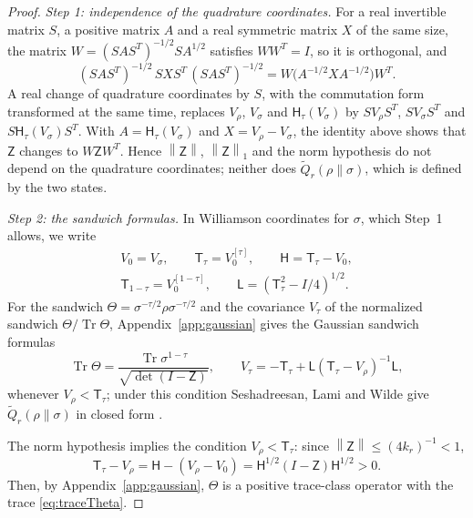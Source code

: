 \documentclass[11pt]{amsart}
\numberwithin{equation}{section}
\theoremstyle{definition}
\newcommand{\Therm}{\mathsf H}
\newcommand{\Qtil}{\widetilde Q}
\newcommand{\Tr}{\operatorname{Tr}}
\newcommand{\norm}[1]{\left\|#1\right\|}
\begin{document}
\begin{proof}
\emph{Step 1: independence of the quadrature coordinates.} For a real
invertible matrix \(S\), a positive matrix \(A\) and a real symmetric
matrix \(X\) of the same size, the matrix
\(W=(SAS^T)^{-1/2}SA^{1/2}\) satisfies \(WW^T=I\), so it is
orthogonal, and
\[
 (SAS^T)^{-1/2}\,SXS^T\,(SAS^T)^{-1/2}
 =W\bigl(A^{-1/2}XA^{-1/2}\bigr)W^T.
\]
A real change of quadrature coordinates by \(S\), with the commutation
form transformed at the same time, replaces \(V_\rho\), \(V_\sigma\) and
\(\Therm_\tau(V_\sigma)\) by \(SV_\rho S^T\), \(SV_\sigma S^T\) and
\(S\Therm_\tau(V_\sigma)S^T\).
With \(A=\Therm_\tau(V_\sigma)\) and \(X=V_\rho-V_\sigma\), the identity
above shows that \(\mathsf Z\) changes to \(W\mathsf ZW^T\). Hence
\(\norm{\mathsf Z}\), \(\norm{\mathsf Z}_1\) and the norm hypothesis do
not depend on the quadrature coordinates; neither does
\(\Qtil_r(\rho\|\sigma)\), which is defined by the two states.

\smallskip
\emph{Step 2: the sandwich formulas.} In Williamson coordinates for
\(\sigma\), which Step~1 allows, we write
\[
 \begin{gathered}
 V_0=V_\sigma,\qquad
 \mathsf T_\tau=V_0^{[\tau]},\qquad \mathsf H=\mathsf T_\tau-V_0,\\
 \mathsf T_{1-\tau}=V_0^{[1-\tau]},\qquad
 \mathsf L=(\mathsf T_\tau^2-I/4)^{1/2}.
 \end{gathered}
\]
For the sandwich \(\Theta=\sigma^{-\tau/2}\rho\sigma^{-\tau/2}\) and the
covariance \(V_\tau\) of the normalized sandwich \(\Theta/{\Tr\Theta}\),
Appendix~\ref{app:gaussian} gives the Gaussian sandwich formulas
\begin{equation}
 \Tr\Theta
 =\frac{\Tr\sigma^{1-\tau}}{\sqrt{\det(I-\mathsf Z)}},
 \qquad
 V_\tau=-\mathsf T_\tau+
       \mathsf L(\mathsf T_\tau-V_\rho)^{-1}\mathsf L,
 \label{eq:sandwich}
\end{equation}
whenever \(V_\rho<\mathsf T_\tau\); under
this condition Seshadreesan, Lami and Wilde give \(\Qtil_r(\rho\|\sigma)\)
in closed form \cite[Theorem~22]{SLW18}.

The norm hypothesis implies the condition \(V_\rho<\mathsf T_\tau\): since \(\norm{\mathsf Z}\le(4k_r)^{-1}<1\),
\[
 \mathsf T_\tau-V_\rho
 =\mathsf H-(V_\rho-V_0)
 =\mathsf H^{1/2}(I-\mathsf Z)\mathsf H^{1/2}>0.
\]
Then, by Appendix~\ref{app:gaussian}, \(\Theta\) is a positive
trace-class operator with the trace \eqref{eq:traceTheta}.


\end{proof}
\end{document}
